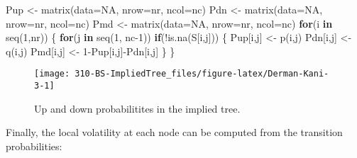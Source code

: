 \documentclass[]{tufte-book}
\newenvironment{Shaded}{}{}
\newcommand{\AttributeTok}[1]{\textcolor[rgb]{0.49,0.56,0.16}{#1}}
\newcommand{\ConstantTok}[1]{\textcolor[rgb]{0.53,0.00,0.00}{#1}}
\newcommand{\ControlFlowTok}[1]{\textcolor[rgb]{0.00,0.44,0.13}{\textbf{#1}}}
\newcommand{\DecValTok}[1]{\textcolor[rgb]{0.25,0.63,0.44}{#1}}
\newcommand{\FunctionTok}[1]{\textcolor[rgb]{0.02,0.16,0.49}{#1}}
\newcommand{\NormalTok}[1]{#1}
\newcommand{\OtherTok}[1]{\textcolor[rgb]{0.00,0.44,0.13}{#1}}
\newcommand{\SpecialCharTok}[1]{\textcolor[rgb]{0.25,0.44,0.63}{#1}}
\begin{document}
\begin{Shaded}
\begin{Highlighting}[]
\NormalTok{  Pup }\OtherTok{\textless{}{-}} \FunctionTok{matrix}\NormalTok{(}\AttributeTok{data=}\ConstantTok{NA}\NormalTok{, }\AttributeTok{nrow=}\NormalTok{nr, }\AttributeTok{ncol=}\NormalTok{nc)}
\NormalTok{  Pdn }\OtherTok{\textless{}{-}} \FunctionTok{matrix}\NormalTok{(}\AttributeTok{data=}\ConstantTok{NA}\NormalTok{, }\AttributeTok{nrow=}\NormalTok{nr, }\AttributeTok{ncol=}\NormalTok{nc)}
\NormalTok{  Pmd }\OtherTok{\textless{}{-}} \FunctionTok{matrix}\NormalTok{(}\AttributeTok{data=}\ConstantTok{NA}\NormalTok{, }\AttributeTok{nrow=}\NormalTok{nr, }\AttributeTok{ncol=}\NormalTok{nc)}
  \ControlFlowTok{for}\NormalTok{(i }\ControlFlowTok{in} \FunctionTok{seq}\NormalTok{(}\DecValTok{1}\NormalTok{,nr)) \{}
    \ControlFlowTok{for}\NormalTok{(j }\ControlFlowTok{in} \FunctionTok{seq}\NormalTok{(}\DecValTok{1}\NormalTok{, nc}\DecValTok{{-}1}\NormalTok{))}
      \ControlFlowTok{if}\NormalTok{(}\SpecialCharTok{!}\FunctionTok{is.na}\NormalTok{(S[i,j])) \{}
\NormalTok{        Pup[i,j] }\OtherTok{\textless{}{-}} \FunctionTok{p}\NormalTok{(i,j)}
\NormalTok{        Pdn[i,j] }\OtherTok{\textless{}{-}} \FunctionTok{q}\NormalTok{(i,j)}
\NormalTok{        Pmd[i,j] }\OtherTok{\textless{}{-}} \DecValTok{1}\SpecialCharTok{{-}}\NormalTok{Pup[i,j]}\SpecialCharTok{{-}}\NormalTok{Pdn[i,j]}
\NormalTok{      \}}
\NormalTok{  \}}
\end{Highlighting}
\end{Shaded}

\begin{figure}
\texttt{[image: 310-BS-ImpliedTree\_files/figure-latex/Derman-Kani-3-1]} \caption[Up and down probabilitites in the implied tree]{Up and down probabilitites in the implied tree.}\label{fig:Derman-Kani-3}
\end{figure}

Finally, the local volatility at each node can be computed from the
transition probabilities:
\end{document}
